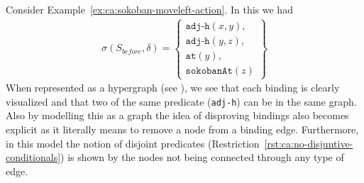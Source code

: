\documentclass[../Master.tex]{subfiles}
\begin{document}
\begin{example}\label{ex:ca:sokoban-hypergraph}
	Consider Example~\ref{ex:ca:sokoban-moveleft-action}. In this we had
	\begin{align*}
		\sigma(S_{before}, \delta) =
			\left\{
			\begin{gathered}
				\texttt{adj-h}(x, y), \\
				\texttt{adj-h}(y, z), \\
				\texttt{at}(y), \\
				\texttt{sokobanAt}(z)
			\end{gathered}
			\right\}
	\end{align*}
	When represented as a hypergraph (see ),
	we see that each binding is clearly visualized and that two of the same predicate (\texttt{adj-h}) can be in the same graph.
	Also by modelling this as a graph the idea of disproving bindings also
	becomes explicit as it literally means to remove a node from a binding edge.
	Furthermore, in this model the notion of disjoint predicates (Restriction~\ref{rst:ca:no-disjuntive-conditionals}) is shown by the nodes not being connected through any type of edge.
\end{example}
\end{document}
